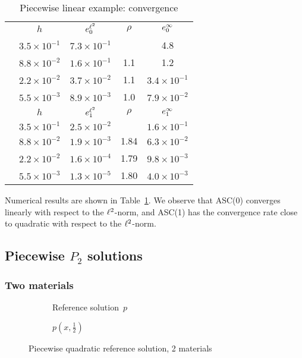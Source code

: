 \begin{table}[h!]
	\centering
	\caption{Piecewise linear example: convergence \label{fig:conv:pwlin}}
	\footnotesize
	\begin{tabular}[1.5]{| c | c || c | c || c |}
		\hline
		\multirow{5}{*}{\rotatebox{90}{ASC(0)}} & $h$ & $e^{{\ell^2}}_{0}$ & $\rho$ & $e^{\infty}_{0}$ \\
		\cline{2-5}
		& $3.5\times10^{-1}$ & $7.3\times10^{-1}$ & & 4.8 \\
		\cline{2-5}
		& $8.8\times10^{-2}$ & $1.6\times10^{-1}$ & 1.1 & 1.2 \\
		\cline{2-5}
		& $2.2\times10^{-2}$ & $3.7\times10^{-2}$ & 1.1 & $3.4\times10^{-1}$ \\
		\cline{2-5}
		& $5.5\times10^{-3}$ & $8.9\times10^{-3}$ & 1.0 & $7.9\times10^{-2}$ \\
		\hline
		\hline
		\multirow{5}{*}{\rotatebox{90}{ASC(1)}} & $h$ & $e^{{\ell^2}}_{1}$ & $\rho$ & $e^{\infty}_{1}$ \\
		\cline{2-5}
		& $3.5\times10^{-1}$ & $2.5\times10^{-2}$ & & $1.6\times10^{-1}$ \\
		\cline{2-5}
		& $8.8\times10^{-2}$ & $1.9\times10^{-3}$ & 1.84 & $6.3\times10^{-2}$ \\
		\cline{2-5}
		& $2.2\times10^{-2}$ & $1.6\times10^{-4}$ & 1.79 & $9.8\times10^{-3}$ \\
		\cline{2-5}
		& $5.5\times10^{-3}$ & $1.3\times10^{-5}$ & 1.80 & $4.0\times10^{-3}$ \\
		\hline
	\end{tabular}
\end{table}

Numerical results are shown in Table~\ref{fig:conv:pwlin}. We observe that ASC(0) converges linearly with respect to the ${\ell^2}$-norm, and ASC(1) has the convergence rate close to quadratic with respect to the ${\ell^2}$-norm.

\subsection{Piecewise $P_2$ solutions}
	
\subsubsection{Two materials}\label{sec:twomat}

\begin{figure}[h]
	\begin{subfigure}{.45\linewidth}
		\centering
		\caption{Reference solution~$p$}
	\end{subfigure}%
	\hfill
	\begin{subfigure}{.45\linewidth}
		\centering
		\caption{$p(x,\frac{1}{2})$}
	\end{subfigure}
	\caption{Piecewise quadratic reference solution, 2 materials\label{fig:pwquad2}}
\end{figure}

